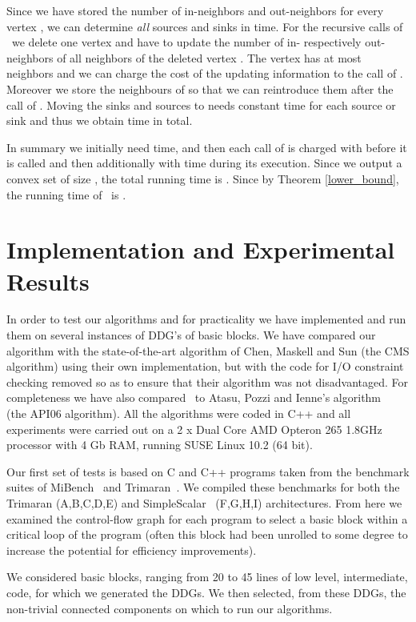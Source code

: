 \documentclass[11pt]{article}
\newcommand{\2}{\vspace{0.2 cm}}
\newcommand\cs{{}}
\begin{document}
Since we have stored the number of in-neighbors and out-neighbors
for every vertex , we can determine \emph{all} sources and
sinks in  time. For the recursive calls of {\cs}\ we delete
one vertex and have to update the number of in- respectively
out-neighbors of all neighbors of the deleted vertex . The vertex
 has at most  neighbors and we can charge the cost of the
updating information to the call of {\cs}. Moreover we store the neighbours
of  so that we can reintroduce them after the call of  {\cs}. Moving the
sinks
and sources to  needs constant time for each source or sink and
thus we obtain  time in total.

In summary we initially need  time, and then each call of
{\cs} is charged with  before it is called and then
additionally with  time during its execution. Since we
output a convex set of size , the total running time is
. Since
  by Theorem \ref{lower_bound}, the running
time of {\cs}\  is .

\section{Implementation and Experimental Results}\label{expersec}


In order to test our algorithms  and {\cs}  for
practicality we have implemented and run them on several instances
of DDG's of basic blocks. We have compared our algorithm with the
state-of-the-art algorithm of Chen, Maskell and Sun \cite{chen}
(the CMS algorithm) using their own implementation, but with the
code for I/O constraint checking removed so as to ensure that their
algorithm was not disadvantaged. For completeness we have also
compared {\cs}\ to Atasu, Pozzi and Ienne's
algorithm~\cite{atasu2006} (the API06 algorithm). All the algorithms
were coded in C++ and all experiments were carried out on a 2 x Dual
Core AMD Opteron 265 1.8GHz processor with 4 Gb RAM, running SUSE
Linux 10.2 (64 bit).

Our first set of tests is based on C and C++ programs taken from the
benchmark suites of MiBench~\cite{MIBENCH} and
Trimaran~\cite{trimaran}. We compiled these benchmarks for both the
Trimaran (A,B,C,D,E) and SimpleScalar~\cite{simplescalar} (F,G,H,I)
architectures. From here we examined the control-flow graph for each
program to select a basic block within a critical loop of the
program (often this block had been unrolled to some degree to
increase the potential for efficiency improvements).


We considered basic blocks, ranging from  20 to 45 lines of low
level, intermediate, code, for which we generated the DDGs. We then
selected, from these DDGs, the non-trivial connected components on
which to run our algorithms.
\end{document}

